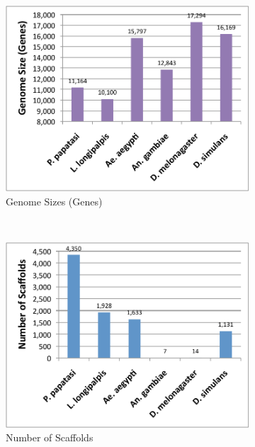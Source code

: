 \begin{figure}[H]
  \centering
  \begin{subfigure}[b]{0.45\textwidth}
    \includegraphics[width=\textwidth]{figures/synteny/genome_size_genes.pdf}
    \caption{Genome Sizes (Genes)}
  \end{subfigure}
  ~
  \begin{subfigure}[b]{0.45\textwidth}
    \includegraphics[width=\textwidth]{figures/synteny/scaffold_counts.pdf}
    \caption{Number of Scaffolds}
    \label{fig:number-scaffolds}
  \end{subfigure}
  ~
  \begin{subfigure}[b]{0.45\textwidth}

\end{subfigure}
\end{figure}
